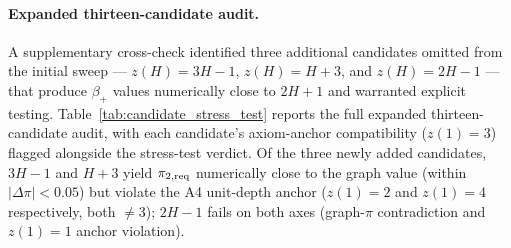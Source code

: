 \paragraph{Expanded thirteen-candidate audit.}
A supplementary cross-check identified three additional candidates omitted from the initial sweep --- \(z(H){=}3H{-}1\), \(z(H){=}H{+}3\), and \(z(H){=}2H{-}1\) --- that produce \(\beta_+\) values numerically close to \(2H{+}1\) and warranted explicit testing. Table~\ref{tab:candidate_stress_test} reports the full expanded thirteen-candidate audit, with each candidate's axiom-anchor compatibility (\(z(1){=}3\)) flagged alongside the stress-test verdict. Of the three newly added candidates, \(3H{-}1\) and \(H{+}3\) yield \(\pi_{2,\rm req}\) numerically close to the graph value (within \(|\Delta\pi|{<}0.05\)) but violate the A4 unit-depth anchor (\(z(1){=}2\) and \(z(1){=}4\) respectively, both \(\neq 3\)); \(2H{-}1\) fails on both axes (graph-\(\pi\) contradiction and \(z(1){=}1\) anchor violation).

